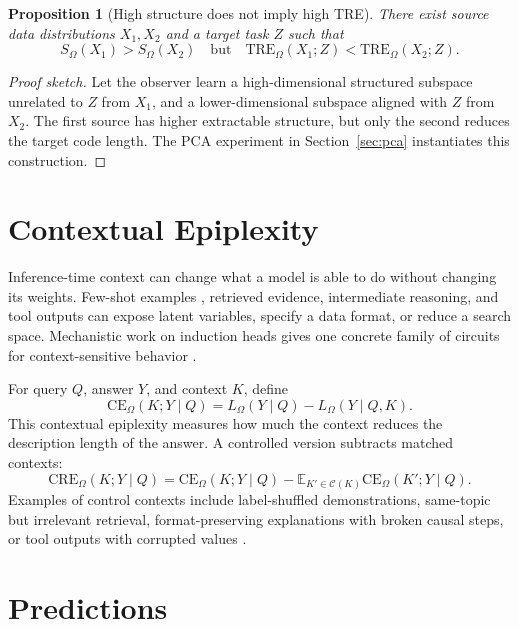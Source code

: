 \documentclass[11pt]{article}
\newtheorem{proposition}{Proposition}
\begin{document}
\begin{proposition}[High structure does not imply high TRE]
There exist source data distributions $X_1, X_2$ and a target task $Z$ such that
\begin{equation}
  S_\Omega(X_1) > S_\Omega(X_2)
  \quad\text{but}\quad
  \mathrm{TRE}_\Omega(X_1;Z) < \mathrm{TRE}_\Omega(X_2;Z).
\end{equation}
\end{proposition}
\begin{proof}[Proof sketch]
Let the observer learn a high-dimensional structured subspace unrelated to $Z$ from $X_1$, and a lower-dimensional subspace aligned with $Z$ from $X_2$. The first source has higher extractable structure, but only the second reduces the target code length. The PCA experiment in Section~\ref{sec:pca} instantiates this construction.
\end{proof}

\section{Contextual Epiplexity}

Inference-time context can change what a model is able to do without changing its weights. Few-shot examples \citep{brown2020fewshot}, retrieved evidence, intermediate reasoning, and tool outputs can expose latent variables, specify a data format, or reduce a search space. Mechanistic work on induction heads gives one concrete family of circuits for context-sensitive behavior \citep{olsson2022induction}.

For query $Q$, answer $Y$, and context $K$, define
\begin{equation}
  \mathrm{CE}_\Omega(K;Y \mid Q)
  =
  L_\Omega(Y \mid Q) - L_\Omega(Y \mid Q,K).
\end{equation}
This contextual epiplexity measures how much the context reduces the description length of the answer. A controlled version subtracts matched contexts:
\begin{equation}
  \mathrm{CRE}_\Omega(K;Y \mid Q)
  =
  \mathrm{CE}_\Omega(K;Y \mid Q)
  -
  \mathbb{E}_{K' \in \mathcal{C}(K)}
  \mathrm{CE}_\Omega(K';Y \mid Q).
\end{equation}
Examples of control contexts include label-shuffled demonstrations, same-topic but irrelevant retrieval, format-preserving explanations with broken causal steps, or tool outputs with corrupted values \citep{zhao2021calibrate}.

\section{Predictions}
\end{document}
